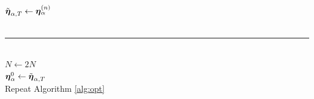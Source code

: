 {\begin{algorithm}
\begin{algorithmic}
\EndWhile\\

${\tilde{\boldsymbol \eta}_{\alpha,T}} \gets {\boldsymbol \eta_\alpha^{(n)}}$ \\~\\

\hrule

 \\
\hspace*{\algorithmicindent} $N \gets 2N$ \\
\hspace*{\algorithmicindent} ${\boldsymbol \eta_\alpha^0} \gets {\tilde{\boldsymbol \eta}_{\alpha,T}}$ \\
\hspace*{\algorithmicindent} Repeat Algorithm \ref{alg:opt}

\EndIf

\end{algorithmic}


\end{algorithm}
}


